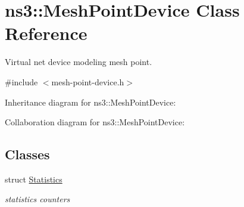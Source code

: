 \hypertarget{classns3_1_1MeshPointDevice}{}\section{ns3\+:\+:Mesh\+Point\+Device Class Reference}
\label{classns3_1_1MeshPointDevice}


Virtual net device modeling mesh point.  




{\ttfamily \#include $<$mesh-\/point-\/device.\+h$>$}



Inheritance diagram for ns3\+:\+:Mesh\+Point\+Device\+:


Collaboration diagram for ns3\+:\+:Mesh\+Point\+Device\+:
\subsection*{Classes}
\begin{DoxyCompactItemize}
\item 
struct \hyperlink{structns3_1_1MeshPointDevice_1_1Statistics}{Statistics}
\begin{DoxyCompactList}\small\item\em statistics counters \end{DoxyCompactList}\end{DoxyCompactItemize}
